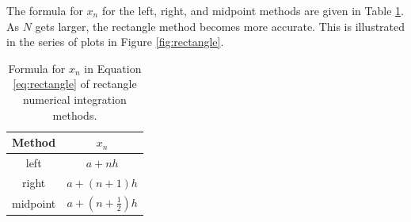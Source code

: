 The formula for $x_n$ for the left, right, and midpoint methods are given in Table \ref{tab:xn-rectangle}.
As $N$ gets larger, the rectangle method becomes more accurate. This is illustrated in the series of plots
in Figure \ref{fig:rectangle}.

\begin{table}[htbp]
  \centering
  \caption{Formula for $x_n$ in Equation \ref{eq:rectangle} of 
  rectangle numerical integration methods.} 
  \label{tab:xn-rectangle}
  \begin{tabular}{cc}
    \textbf{Method} & \textbf{$x_n$} \\ \toprule
    left & $a+nh$ \\ \midrule
    right & $a+(n+1)h$ \\ \midrule
    midpoint & $a+\left(n + \frac{1}{2}\right)h$ \\ \bottomrule
  \end{tabular}
\end{table}

